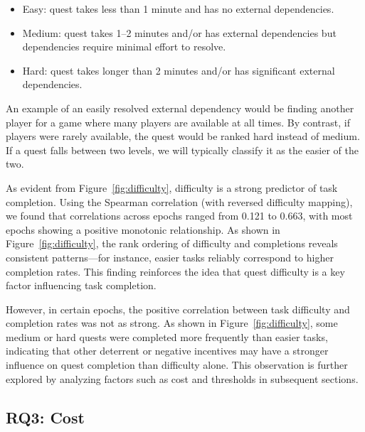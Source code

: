 \begin{itemize}
\item Easy: quest takes less than 1 minute and has no external dependencies.
\item Medium: quest takes 1--2 minutes and/or has external dependencies but dependencies require minimal effort to resolve.
\item Hard: quest takes longer than 2 minutes and/or has significant external dependencies.
\end{itemize}

An example of an easily resolved external dependency would be finding another player for a game where many players are available at all times. By contrast, if players were rarely available, the quest would be ranked hard instead of medium. If a quest falls between two levels, we will typically classify it as the easier of the two. 

As evident from Figure~\ref{fig:difficulty}, difficulty is a strong predictor of task completion.
Using the Spearman correlation (with reversed difficulty mapping), we found that correlations across epochs 
ranged from 0.121 to 0.663, with most epochs showing a positive monotonic relationship. As shown in Figure~\ref{fig:difficulty}, the rank ordering of difficulty and completions reveals consistent patterns---for instance, easier tasks reliably correspond to higher completion rates. This finding reinforces the idea that quest difficulty is a key factor influencing task completion.

However, in certain epochs, the positive correlation between task difficulty and completion rates was not as strong. As shown in Figure~\ref{fig:difficulty}, some medium or hard quests were completed more frequently than easier tasks, indicating that other deterrent or negative incentives may have a stronger influence on quest completion than difficulty alone. This observation is further explored by analyzing factors such as cost and thresholds in subsequent sections.


\subsection{RQ3: Cost}

